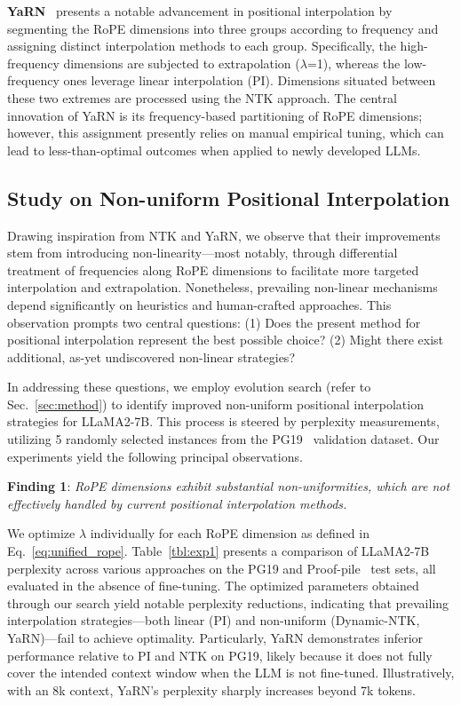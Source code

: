 \textbf{YaRN}~\cite{yarn} presents a notable advancement in positional interpolation by segmenting the RoPE dimensions into three groups according to frequency and assigning distinct interpolation methods to each group. Specifically, the high-frequency dimensions are subjected to extrapolation ($\lambda$=1), whereas the low-frequency ones leverage linear interpolation (PI). Dimensions situated between these two extremes are processed using the NTK approach. The central innovation of YaRN is its frequency-based partitioning of RoPE dimensions; however, this assignment presently relies on manual empirical tuning, which can lead to less-than-optimal outcomes when applied to newly developed LLMs.

\subsection{Study on Non-uniform Positional Interpolation}

Drawing inspiration from NTK and YaRN, we observe that their improvements stem from introducing non-linearity—most notably, through differential treatment of frequencies along RoPE dimensions to facilitate more targeted interpolation and extrapolation. Nonetheless, prevailing non-linear mechanisms depend significantly on heuristics and human-crafted approaches. This observation prompts two central questions: (1) Does the present method for positional interpolation represent the best possible choice? (2) Might there exist additional, as-yet undiscovered non-linear strategies?

In addressing these questions, we employ evolution search (refer to Sec.~\ref{sec:method}) to identify improved non-uniform positional interpolation strategies for LLaMA2-7B. This process is steered by perplexity measurements, utilizing 5 randomly selected instances from the PG19~\cite{pg19} validation dataset. Our experiments yield the following principal observations.

\textbf{Finding 1}: \textit{RoPE dimensions exhibit substantial non-uniformities, which are not effectively handled by current positional interpolation methods.}

We optimize $\lambda$ individually for each RoPE dimension as defined in Eq.~\ref{eq:unified_rope}. Table~\ref{tbl:exp1} presents a comparison of LLaMA2-7B perplexity across various approaches on the PG19 and Proof-pile~\cite{proof-pile} test sets, all evaluated in the absence of fine-tuning. The optimized parameters obtained through our search yield notable perplexity reductions, indicating that prevailing interpolation strategies—both linear (PI) and non-uniform (Dynamic-NTK, YaRN)—fail to achieve optimality. Particularly, YaRN demonstrates inferior performance relative to PI and NTK on PG19, likely because it does not fully cover the intended context window when the LLM is not fine-tuned. Illustratively, with an 8k context, YaRN’s perplexity sharply increases beyond 7k tokens.

